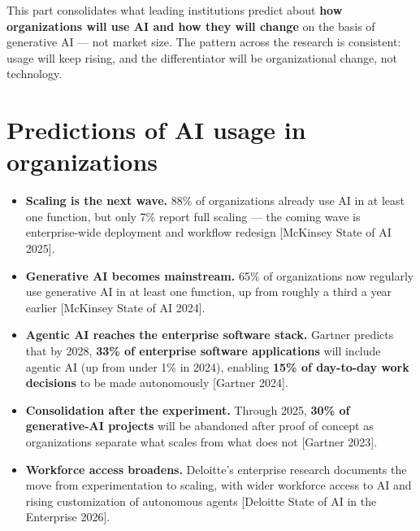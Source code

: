 
This part consolidates what leading institutions predict about \textbf{how
organizations will use AI and how they will change} on the basis of
generative AI — not market size. The pattern across the research is
consistent: usage will keep rising, and the differentiator will be
organizational change, not technology.

\section{Predictions of AI usage in organizations}

\begin{itemize}
  \item \textbf{Scaling is the next wave.} 88\% of organizations already use AI
        in at least one function, but only 7\% report full scaling — the
        coming wave is enterprise-wide deployment and workflow redesign
        [McKinsey State of AI 2025].
  \item \textbf{Generative AI becomes mainstream.} 65\% of organizations now
        regularly use generative AI in at least one function, up from roughly
        a third a year earlier [McKinsey State of AI 2024].
  \item \textbf{Agentic AI reaches the enterprise software stack.} Gartner
        predicts that by 2028, \textbf{33\% of enterprise software
        applications} will include agentic AI (up from under 1\% in 2024),
        enabling \textbf{15\% of day-to-day work decisions} to be made
        autonomously [Gartner 2024].
  \item \textbf{Consolidation after the experiment.} Through 2025,
        \textbf{30\% of generative-AI projects} will be abandoned after proof
        of concept as organizations separate what scales from what does not
        [Gartner 2023].
  \item \textbf{Workforce access broadens.} Deloitte's enterprise research
        documents the move from experimentation to scaling, with wider
        workforce access to AI and rising customization of autonomous agents
        [Deloitte State of AI in the Enterprise 2026].
\end{itemize}


